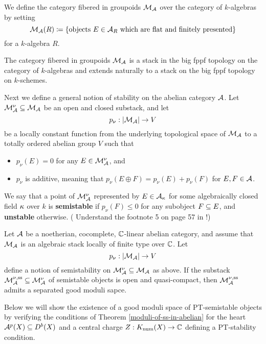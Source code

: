 We define the category fibered in groupoids $\mathcal{M}_{\mathcal{A}}$ over the category of $k$-algebras by setting
\[ \mathcal{M}_{\mathcal{A}}(R) \coloneqq \{\text{objects } E \in \mathcal{A}_R \text{ which are flat and finitely presented} \} \]
for a $k$-algebra $R$.

\begin{lem}
    The category fibered in groupoids $\mathcal{M}_{\mathcal{A}}$ is a stack in the big fppf topology on the category of $k$-algebras and extends naturally to a stack on the big fppf topology on $k$-schemes.
\end{lem}

Next we define a general notion of stability on the abelian category $\mathcal{A}$. Let $\mathcal{M}^\nu_{\mathcal{A}} \subseteq \mathcal{M}_{\mathcal{A}}$ be an open and closed substack, and let 
\[ p_\nu: |\mathcal{M}_{\mathcal{A}}| \to V \]
be a locally constant function from the underlying topological space of $\mathcal{M}_{\mathcal{A}}$ to a totally ordered abelian group $V$ such that 
\begin{itemize}
    \item $p_\nu(E) = 0$ for any $E \in \mathcal{M}^\nu_{\mathcal{A}}$, and
    \item $p_\nu$ is additive, meaning that $p_\nu(E \oplus F) = p_\nu(E) + p_\nu(F)$ for $E, F \in \mathcal{A}$.
\end{itemize}
We say that a point of $\mathcal{M}^\nu_{\mathcal{A}}$ represented by $E \in \mathcal{A}_\kappa$ for some algebraically closed field $\kappa$ over $k$ is \textbf{semistable} if $p_\nu(F) \le 0$ for any subobject $F \subseteq E$, and \textbf{unstable} otherwise. {(\color{red} Understand the footnote 5 on page 57 in \cite{AHLH}!)}

\begin{thm}\label{moduli-of-ss-in-abelian}
    Let $\mathcal{A}$ be a noetherian, cocomplete, $\mathbb{C}$-linear abelian category, and assume that $\mathcal{M}_{\mathcal{A}}$ is an algebraic stack locally of finite type over $\mathbb{C}$. Let 
    \[ p_\nu: |\mathcal{M}_{\mathcal{A}}| \to V \]
    define a notion of semistability on $\mathcal{M}^\nu_{\mathcal{A}} \subseteq \mathcal{M}_{\mathcal{A}}$ as above. If the substack $\mathcal{M}^{\nu\text{,ss}}_{\mathcal{A}} \subseteq \mathcal{M}^\nu_{\mathcal{A}}$ of semistable objects is open and quasi-compact, then $\mathcal{M}^{\nu\text{,ss}}_{\mathcal{A}}$ admits a separated good moduli sapce.
\end{thm}

Below we will show the existence of a good moduli space of PT-semistable objects by verifying the conditions of Theorem \ref{moduli-of-ss-in-abelian} for the heart $\mathcal{A}^p(X) \subseteq D^b(X)$ and a central charge $Z: K_{\mathrm{num}}(X) \to \mathbb{C}$ defining a PT-stability condition.

